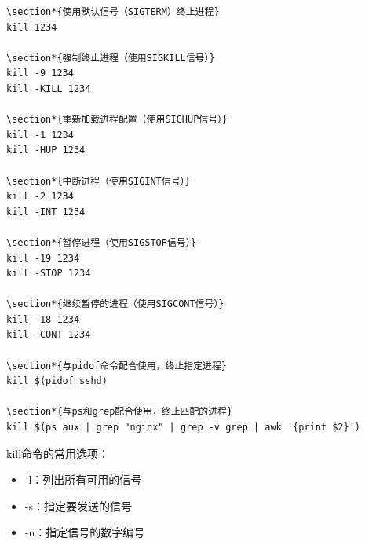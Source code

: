 \documentclass[12pt,UTF8]{ctexbook}
\begin{document}
\begin{verbatim}
\section*{使用默认信号（SIGTERM）终止进程}
kill 1234

\section*{强制终止进程（使用SIGKILL信号）}
kill -9 1234
kill -KILL 1234

\section*{重新加载进程配置（使用SIGHUP信号）}
kill -1 1234
kill -HUP 1234

\section*{中断进程（使用SIGINT信号）}
kill -2 1234
kill -INT 1234

\section*{暂停进程（使用SIGSTOP信号）}
kill -19 1234
kill -STOP 1234

\section*{继续暂停的进程（使用SIGCONT信号）}
kill -18 1234
kill -CONT 1234

\section*{与pidof命令配合使用，终止指定进程}
kill $(pidof sshd)

\section*{与ps和grep配合使用，终止匹配的进程}
kill $(ps aux | grep "nginx" | grep -v grep | awk '{print $2}')
\end{verbatim}

kill命令的常用选项：
\begin{itemize}
    \item -l：列出所有可用的信号
    \item -s：指定要发送的信号
    \item -n：指定信号的数字编号
\end{itemize}
\end{document}
